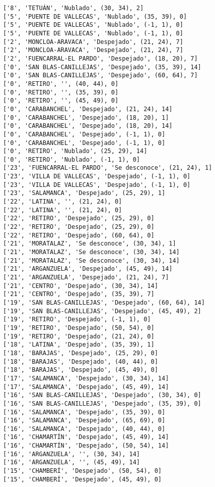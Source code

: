 \documentclass[11pt]{article}
\begin{document}
\begin{Verbatim}[commandchars=\\\{\}]
['8', 'TETUÁN', 'Nublado', (30, 34), 2]
['5', 'PUENTE DE VALLECAS', 'Nublado', (35, 39), 0]
['5', 'PUENTE DE VALLECAS', 'Nublado', (-1, 1), 0]
['5', 'PUENTE DE VALLECAS', 'Nublado', (-1, 1), 0]
['2', 'MONCLOA-ARAVACA', 'Despejado', (21, 24), 7]
['2', 'MONCLOA-ARAVACA', 'Despejado', (21, 24), 7]
['2', 'FUENCARRAL-EL PARDO', 'Despejado', (18, 20), 7]
['0', 'SAN BLAS-CANILLEJAS', 'Despejado', (35, 39), 14]
['0', 'SAN BLAS-CANILLEJAS', 'Despejado', (60, 64), 7]
['0', 'RETIRO', '', (40, 44), 0]
['0', 'RETIRO', '', (35, 39), 0]
['0', 'RETIRO', '', (45, 49), 0]
['0', 'CARABANCHEL', 'Despejado', (21, 24), 14]
['0', 'CARABANCHEL', 'Despejado', (18, 20), 1]
['0', 'CARABANCHEL', 'Despejado', (18, 20), 14]
['0', 'CARABANCHEL', 'Despejado', (-1, 1), 0]
['0', 'CARABANCHEL', 'Despejado', (-1, 1), 0]
['0', 'RETIRO', 'Nublado', (25, 29), 14]
['0', 'RETIRO', 'Nublado', (-1, 1), 0]
['23', 'FUENCARRAL-EL PARDO', 'Se desconoce', (21, 24), 1]
['23', 'VILLA DE VALLECAS', 'Despejado', (-1, 1), 0]
['23', 'VILLA DE VALLECAS', 'Despejado', (-1, 1), 0]
['23', 'SALAMANCA', 'Despejado', (25, 29), 1]
['22', 'LATINA', '', (21, 24), 0]
['22', 'LATINA', '', (21, 24), 0]
['22', 'RETIRO', 'Despejado', (25, 29), 0]
['22', 'RETIRO', 'Despejado', (25, 29), 0]
['22', 'RETIRO', 'Despejado', (60, 64), 0]
['21', 'MORATALAZ', 'Se desconoce', (30, 34), 1]
['21', 'MORATALAZ', 'Se desconoce', (30, 34), 14]
['21', 'MORATALAZ', 'Se desconoce', (30, 34), 14]
['21', 'ARGANZUELA', 'Despejado', (45, 49), 14]
['21', 'ARGANZUELA', 'Despejado', (21, 24), 7]
['21', 'CENTRO', 'Despejado', (30, 34), 14]
['21', 'CENTRO', 'Despejado', (35, 39), 7]
['19', 'SAN BLAS-CANILLEJAS', 'Despejado', (60, 64), 14]
['19', 'SAN BLAS-CANILLEJAS', 'Despejado', (45, 49), 2]
['19', 'RETIRO', 'Despejado', (-1, 1), 0]
['19', 'RETIRO', 'Despejado', (50, 54), 0]
['19', 'RETIRO', 'Despejado', (21, 24), 0]
['18', 'LATINA', 'Despejado', (35, 39), 1]
['18', 'BARAJAS', 'Despejado', (25, 29), 0]
['18', 'BARAJAS', 'Despejado', (40, 44), 0]
['18', 'BARAJAS', 'Despejado', (45, 49), 0]
['17', 'SALAMANCA', 'Despejado', (30, 34), 14]
['17', 'SALAMANCA', 'Despejado', (45, 49), 14]
['16', 'SAN BLAS-CANILLEJAS', 'Despejado', (30, 34), 0]
['16', 'SAN BLAS-CANILLEJAS', 'Despejado', (35, 39), 0]
['16', 'SALAMANCA', 'Despejado', (35, 39), 0]
['16', 'SALAMANCA', 'Despejado', (65, 69), 0]
['16', 'SALAMANCA', 'Despejado', (40, 44), 0]
['16', 'CHAMARTÍN', 'Despejado', (45, 49), 14]
['16', 'CHAMARTÍN', 'Despejado', (50, 54), 14]
['16', 'ARGANZUELA', '', (30, 34), 14]
['16', 'ARGANZUELA', '', (45, 49), 14]
['15', 'CHAMBERÍ', 'Despejado', (50, 54), 0]
['15', 'CHAMBERÍ', 'Despejado', (45, 49), 0]

\end{Verbatim}
\end{document}
